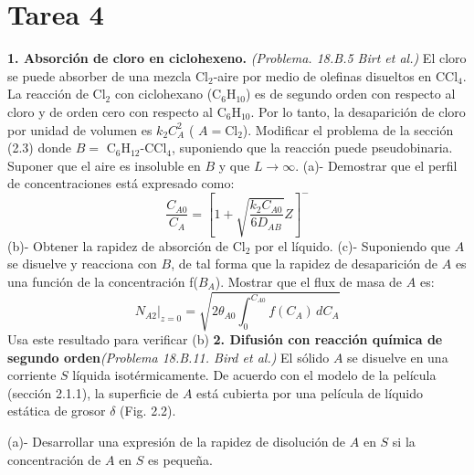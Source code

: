 \section*{Tarea 4}

\textbf{1. Absorción de cloro en ciclohexeno.} \textit{(Problema. 18.B.5 Birt et al.)}
\flushleft
El cloro se puede absorber de una mezcla Cl$_2$-aire por medio de olefinas disueltos en CCl$_4$. La reacción de Cl$_2$ con ciclohexano (C$_{6}$H$_{10}$) es de segundo orden con respecto al cloro y de orden cero con respecto al C$_{6}$H$_{10}$. Por lo tanto, la desaparición de cloro por unidad de volumen es $k_2 C_A^2$ ( $A = \text{Cl}_2$).
\flushleft
Modificar el problema de la sección (2.3) donde $B =$ C$_{6}$H$_{12}$-CCl$_4$, suponiendo que la reacción puede pseudobinaria. Suponer que el aire es insoluble en $B$ y que $L \to \infty$.
\flushleft
(a)- Demostrar que el perfil de concentraciones está expresado como:
 \[ 
 \frac{C_{A0}}{C_{A}} = \left[1 + \sqrt{\frac{k_2 C_{A0}}{6D_{AB}}} Z \right]^{-}
    \]
(b)- Obtener la rapidez de absorción de Cl$_2$ por el líquido.
\flushleft
(c)- Suponiendo que $A$ se disuelve y reacciona con $B$, de tal forma que la rapidez de desaparición de $A$ es una función de la concentración f($B_A$). Mostrar que el flux de masa de $A$ es:
\[
N_{A2} \bigg|_{z=0} = \sqrt{2 \theta_{A0} \int_{0}^{C_{A0}} f(C_A) \, dC_A}
\]
Usa este resultado para verificar (b)
\flushleft
\textbf{2.  Difusión con reacción química de segundo orden}\textit{(Problema 18.B.11. Bird et al.)}
\flushleft
El sólido $A$ se disuelve en una corriente $S$ líquida isotérmicamente. De acuerdo con el modelo de la película (sección 2.1.1), la superficie de $A$ está cubierta por una película de líquido estática de grosor $\delta$ (Fig. 2.2).

(a)- Desarrollar una expresión de la rapidez de disolución de $A$ en $S$ si la concentración de $A$ en $S$ es pequeña.

